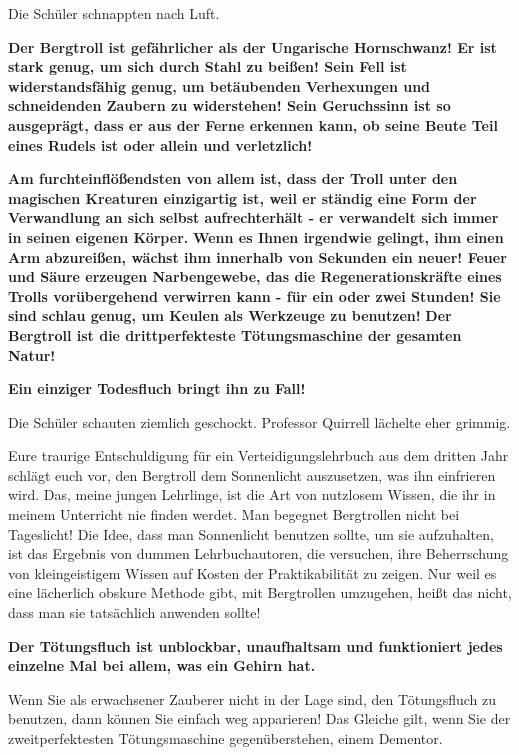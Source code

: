 Die Schüler schnappten nach Luft.

\textbf{\glqq Der Bergtroll ist gefährlicher als der Ungarische Hornschwanz! Er
ist stark genug, um sich durch Stahl zu beißen! Sein Fell ist widerstandsfähig
genug, um betäubenden Verhexungen und schneidenden Zaubern zu widerstehen! Sein
Geruchssinn ist so ausgeprägt, dass er aus der Ferne erkennen kann, ob seine
Beute Teil eines Rudels ist oder allein und verletzlich!}

\textbf{Am furchteinflößendsten von allem ist, dass der Troll unter den
magischen Kreaturen einzigartig ist, weil er ständig eine Form der Verwandlung
an sich selbst aufrechterhält - er verwandelt sich immer in seinen eigenen
Körper.} \textbf{Wenn es Ihnen irgendwie gelingt, ihm einen Arm abzureißen,
wächst ihm innerhalb von Sekunden ein neuer! Feuer und Säure erzeugen
Narbengewebe, das die Regenerationskräfte eines Trolls vorübergehend verwirren
kann - für ein oder zwei Stunden! Sie sind schlau genug, um Keulen als Werkzeuge
zu benutzen! } \textbf{Der Bergtroll ist die drittperfekteste Tötungsmaschine
der gesamten Natur!}

\textbf{Ein einziger Todesfluch bringt ihn zu Fall!}\grqq{}

Die Schüler schauten ziemlich geschockt. Professor Quirrell lächelte eher
grimmig.

\glqq Eure traurige Entschuldigung für ein Verteidigungslehrbuch aus dem dritten
Jahr schlägt euch vor, den Bergtroll dem Sonnenlicht auszusetzen, was ihn
einfrieren wird. Das, meine jungen Lehrlinge, ist die Art von nutzlosem Wissen,
die ihr in meinem Unterricht nie finden werdet. Man begegnet Bergtrollen nicht
bei Tageslicht! Die Idee, dass man Sonnenlicht benutzen sollte, um sie
aufzuhalten, ist das Ergebnis von dummen Lehrbuchautoren, die versuchen, ihre
Beherrschung von kleingeistigem Wissen auf Kosten der Praktikabilität zu zeigen.
Nur weil es eine lächerlich obskure Methode gibt, mit Bergtrollen umzugehen,
heißt das nicht, dass man sie tatsächlich anwenden sollte!

\textbf{Der Tötungsfluch ist unblockbar, unaufhaltsam und funktioniert jedes
einzelne Mal bei allem, was ein Gehirn hat.}

Wenn Sie als erwachsener Zauberer nicht in der Lage sind, den Tötungsfluch zu
benutzen, dann können Sie einfach weg apparieren! Das Gleiche gilt, wenn Sie der
zweitperfektesten Tötungsmaschine gegenüberstehen, einem Dementor.

